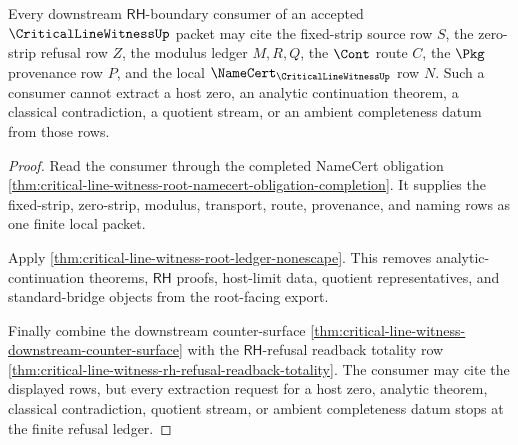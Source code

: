 \begin{theorem}
\label{thm:critical-line-witness-rh-refusal-consumer-nonescape}
Every downstream $\mathsf{RH}$-boundary consumer of an accepted
$\CriticalLineWitnessUp$ packet may cite the fixed-strip source row $S$, the
zero-strip refusal row $Z$, the modulus ledger $M,R,Q$, the $\Cont$ route
$C$, the $\Pkg$ provenance row $P$, and the local
$\NameCert_{\CriticalLineWitnessUp}$ row $N$. Such a consumer cannot extract
a host zero, an analytic continuation theorem, a classical contradiction, a
quotient stream, or an ambient completeness datum from those rows.
\end{theorem}
\begin{proof}
Read the consumer through the completed NameCert obligation
\autoref{thm:critical-line-witness-root-namecert-obligation-completion}. It
supplies the fixed-strip, zero-strip, modulus, transport, route, provenance,
and naming rows as one finite local packet.

Apply \autoref{thm:critical-line-witness-root-ledger-nonescape}. This removes
analytic-continuation theorems, $\mathsf{RH}$ proofs, host-limit data,
quotient representatives, and standard-bridge objects from the root-facing
export.

Finally combine the downstream counter-surface
\autoref{thm:critical-line-witness-downstream-counter-surface} with the
$\mathsf{RH}$-refusal readback totality row
\autoref{thm:critical-line-witness-rh-refusal-readback-totality}. The
consumer may cite the displayed rows, but every extraction request for a host
zero, analytic theorem, classical contradiction, quotient stream, or ambient
completeness datum stops at the finite refusal ledger.
\end{proof}
